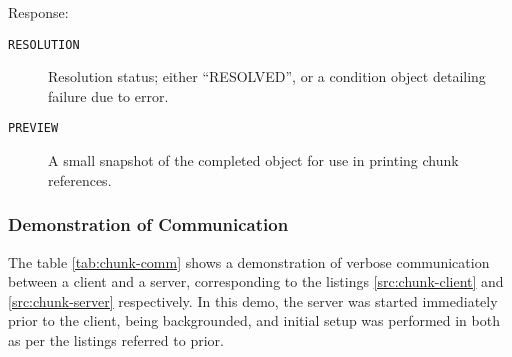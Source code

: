 Response:
\begin{description}
	\item[\texttt{RESOLUTION}] Resolution status; either ``RESOLVED'', or a
		condition object detailing failure due to error.
	\item[\texttt{PREVIEW}]  A small snapshot of the completed object for
		use in printing chunk references.
\end{description}

\subsubsection{Demonstration of Communication}

The table \ref{tab:chunk-comm} shows a demonstration of verbose communication
between a client and a server, corresponding to the listings
\ref{src:chunk-client} and \ref{src:chunk-server} respectively.
In this demo, the server was started immediately prior to the client, being
backgrounded, and initial setup was performed in both as per the listings
referred to prior.


